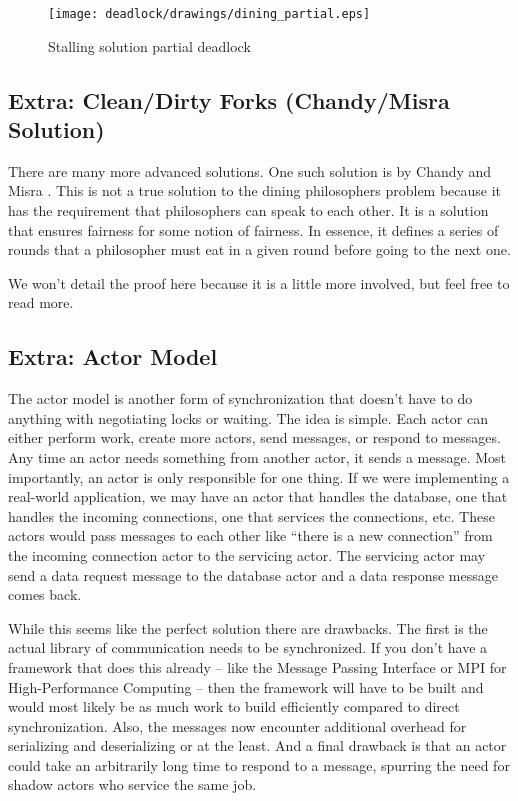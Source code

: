 \begin{figure}[H]
\centering
\texttt{[image: deadlock/drawings/dining\_partial.eps]}
\caption{Stalling solution partial deadlock}
\end{figure}

\subsection{Extra: Clean/Dirty Forks (Chandy/Misra Solution)}

There are many more advanced solutions.
One such solution is by Chandy and Misra \cite{Chandy:1984:DPP:1780.1804}.
This is not a true solution to the dining philosophers problem because it has the requirement that philosophers can speak to each other.
It is a solution that ensures fairness for some notion of fairness.
In essence, it defines a series of rounds that a philosopher must eat in a given round before going to the next one.

We won't detail the proof here because it is a little more involved, but feel free to read more.

\subsection{Extra: Actor Model}

The actor model is another form of synchronization that doesn't have to do anything with negotiating locks or waiting.
The idea is simple.
Each actor can either perform work, create more actors, send messages, or respond to messages.
Any time an actor needs something from another actor, it sends a message.
Most importantly, an actor is only responsible for one thing.
If we were implementing a real-world application, we may have an actor that handles the database, one that handles the incoming connections, one that services the connections, etc.
These actors would pass messages to each other like ``there is a new connection'' from the incoming connection actor to the servicing actor.
The servicing actor may send a data request message to the database actor and a data response message comes back.

While this seems like the perfect solution there are drawbacks.
The first is the actual library of communication needs to be synchronized.
If you don't have a framework that does this already -- like the Message Passing Interface or MPI for High-Performance Computing -- then the framework will have to be built and would most likely be as much work to build efficiently compared to direct synchronization.
Also, the messages now encounter additional overhead for serializing and deserializing or at the least.
And a final drawback is that an actor could take an arbitrarily long time to respond to a message, spurring the need for shadow actors who service the same job.

